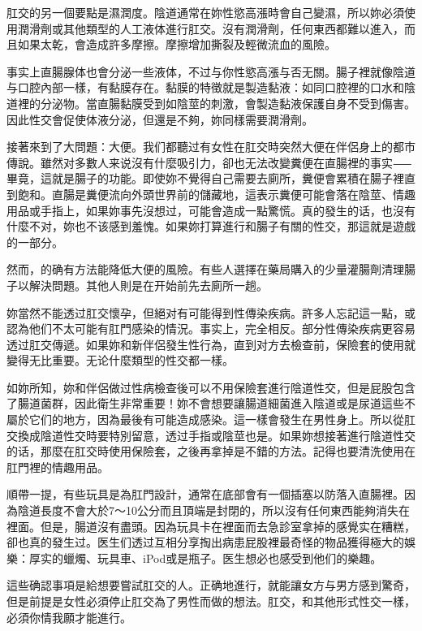 \documentclass[12pt,UTF8]{ctexbook}
\begin{document}
肛交的另一個要點是濕潤度。陰道通常在妳性慾高漲時會自己變濕，所以妳必須使用潤滑劑或其他類型的人工液体進行肛交。沒有潤滑劑，任何東西都難以進入，而且如果太乾，會造成許多摩擦。摩擦增加撕裂及輕微流血的風險。

事实上直腸腺体也會分泌一些液体，不过与你性慾高漲与否无關。腸子裡就像陰道与口腔內部一樣，有黏膜存在。黏膜的特徵就是製造黏液：如同口腔裡的口水和陰道裡的分泌物。當直腸黏膜受到如陰莖的刺激，會製造黏液保護自身不受到傷害。因此性交會促使体液分泌，但還是不夠，妳同樣需要潤滑劑。

接著來到了大問題：大便。我们都聽过有女性在肛交時突然大便在伴侶身上的都市傳說。雖然对多數人来说沒有什麼吸引力，卻也无法改變糞便在直腸裡的事实⸺畢竟，這就是腸子的功能。即使妳不覺得自己需要去廁所，糞便會累積在腸子裡直到飽和。直腸是糞便流向外頭世界前的儲藏地，這表示糞便可能會落在陰莖、情趣用品或手指上，如果妳事先沒想过，可能會造成一點驚慌。真的發生的话，也沒有什麼不对，妳也不该感到羞愧。如果妳打算進行和腸子有關的性交，那這就是遊戲的一部分。

然而，的确有方法能降低大便的風險。有些人選擇在藥局購入的少量灌腸劑清理腸子以解決問題。其他人則是在开始前先去廁所一趟。

妳當然不能透过肛交懷孕，但絕对有可能得到性傳染疾病。許多人忘記這一點，或認為他们不太可能有肛門感染的情況。事实上，完全相反。部分性傳染疾病更容易透过肛交傳遞。如果妳和新伴侶發生性行為，直到对方去檢查前，保險套的使用就變得无比重要。无论什麼類型的性交都一樣。

如妳所知，妳和伴侶做过性病檢查後可以不用保險套進行陰道性交，但是屁股包含了腸道菌群，因此衛生非常重要！妳不會想要讓腸道細菌進入陰道或是尿道這些不屬於它们的地方，因為最後有可能造成感染。這一樣會發生在男性身上。所以從肛交換成陰道性交時要特別留意，透过手指或陰莖也是。如果妳想接著進行陰道性交的话，那麼在肛交時使用保險套，之後再拿掉是不錯的方法。記得也要清洗使用在肛門裡的情趣用品。

順帶一提，有些玩具是為肛門設計，通常在底部會有一個插塞以防落入直腸裡。因為陰道長度不會大於7〜10公分而且頂端是封閉的，所以沒有任何東西能夠消失在裡面。但是，腸道沒有盡頭。因為玩具卡在裡面而去急診室拿掉的感覺实在糟糕，卻也真的發生过。医生们透过互相分享掏出病患屁股裡最奇怪的物品獲得極大的娛樂：厚实的蠟燭、玩具車、iPod或是瓶子。医生想必也感受到他们的樂趣。

這些确認事項是給想要嘗試肛交的人。正确地進行，就能讓女方与男方感到驚奇，但是前提是女性必須停止肛交為了男性而做的想法。肛交，和其他形式性交一樣，必須你情我願才能進行。
\end{document}
